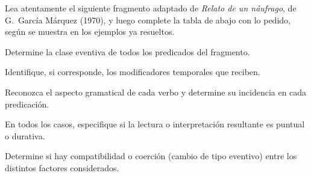 \begin{ejercicio}\label{ej:08-naufrago}
Lea atentamente el siguiente fragmento adaptado de \textit{Relato de un
náufrago}, de G.~García Márquez (1970), y luego complete la tabla de abajo con
lo pedido, según se muestra en los ejemplos ya resueltos.


\begin{consignas}
  \item Determine la clase eventiva de todos los predicados del fragmento.
  \item Identifique, si corresponde, los modificadores temporales que reciben.
  \item Reconozca el aspecto gramatical de cada verbo y determine su incidencia
        en cada predicación.
  \item En todos los casos, especifique si la lectura o interpretación
        resultante es puntual o durativa.
  \item Determine si hay compatibilidad o coerción (cambio de tipo eventivo)
        entre los distintos factores considerados.
\end{consignas}


\end{ejercicio}
